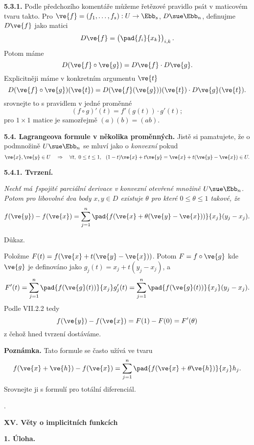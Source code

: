 \documentclass[12pt]{article}
\begin{document}
{\medskip

{\bf 5.3.1.} Podle předchozího komentáře můžeme řetězové pravidlo psát v maticovém tvaru
takto. 
Pro $\ve{f}=(f_1,\dots,f_s):U\to\Ebb_s$, $D\sue \Ebb_n$, definujme $D\ve{f}$ jako matici
$$
D\ve{f}=\begin{pmatrix}\pad{f_i}{x_k}\end{pmatrix}_{i,k}.
$$
Potom máme
$$
D(\ve{f}\circ\ve{g})=D\ve{f}\cdot D\ve{g}.
$$
Explicitněji máme v konkretním argumentu $\ve{t}$ 
$$
D(\ve{f}\circ\ve{g})(\ve{t})=D(\ve{f}(\ve{g}))(\ve{t})\cdot D\ve{g}(\ve{t}).
$$
srovnejte to s pravidlem v jedné proměnné
$$
(f\circ g)'(t)=f'(g(t))\cdot g'(t);
$$
pro $1\times 1$ matice je samozřejmě $(a)(b)=(ab)$.

\bigskip

{\bf 5.4. Lagrangeova  formule v několika proměnných.} Jistě si pamatujete, že o podmnožině $U\sue \Ebb_n$ se mluví jako o {\em konvexní} pokud
$$
\ve{x},\ve{y}\in U\quad\Rightarrow\quad \forall t, \
 0\leq t\leq 1,\ \ (1-t)\ve{x}+t\ve{y}=\ve{x}+t(\ve{y}-\ve{x})\in U.
$$

\medskip

{\bf 5.4.1. Tvrzení.} {\em Nechť má $f$spojité parciální derivace v konvexní
otevřené množině $U\sue\Ebb_n$. Potom pro libovolné dva body
 $x,y\in D$ existuje $\theta$ pro které $0\leq \theta\leq 1$ takové, že
$$
f(\ve{y})-f(\ve{x})=\sum_{j=1}^n\pad{f(\ve{x}+\theta(\ve{y}-\ve{x}))}{x_j}(y_j-x_j).
$$

Důkaz.} Položme $F(t)=f(\ve{x}+t(\ve{y}-\ve{x}))$. Potom $F= f\circ\ve{g}$ 
kde $\ve{g}$ je definováno jako $g_j(t)=x_j+t(y_j-x_j)$, a
$$
F'(t)=\sum_{j=1}^n\pad{f(\ve{g}(t))}{x_j}g_j'(t)=\sum_{j=1}^n\pad{f(\ve{g}(t))}{x_j}(y_j-x_j).
$$
Podle VII.2.2 tedy
$$
f(\ve{y})-f(\ve{x})=F(1)-F(0)=F'(\theta)
$$
z čehož hned tvrzení dostáváme. \sq

\medskip

{\bf Poznámka.} Tato formule se často užívá ve tvaru
$$
f(\ve{x}+\ve{h})-f(\ve{x})=\sum_{j=1}^n\pad{f(\ve{x}+\theta\ve{h})}{x_j}h_j.
$$
Srovnejte ji s formulí pro totální diferenciál.

\newpage
.

\newpage 
 
\centerline{\Large\bf XV.  Věty o implicitních funkcích} 
 
 
 \vskip10mm
 
  
 {\large\bf 1. Úloha.}
 
 \bigskip
 
}
\end{document}
